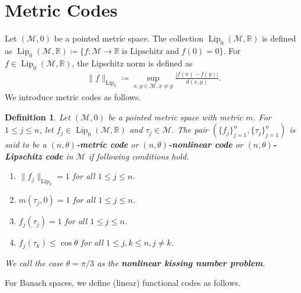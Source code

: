 \documentclass{amsart}
\newtheorem{definition}[theorem]{Definition}
\begin{document}
 \section{Metric Codes}
  Let $(\mathcal{M}, 0)$ be a pointed metric space. The collection 	$\operatorname{Lip}_0(\mathcal{M}, \mathbb{R})$
 is defined as $\operatorname{Lip}_0(\mathcal{M},\mathbb{R})\coloneqq \{f:\mathcal{M} 
 \rightarrow \mathbb{R}  \operatorname{ is ~ Lipschitz ~ and } f(0)=0\}.$
 For $f \in \operatorname{Lip}_0(\mathcal{M}, \mathbb{R})$, the Lipschitz norm
 is defined as 
 \begin{align*}
 	\|f\|_{\operatorname{Lip}_0}\coloneqq \sup_{x, y \in \mathcal{M}, x\neq
 		y} \frac{|f(x)-f(y)|}{d(x,y)}.
 \end{align*}
 We introduce metric  codes as follows.
 \begin{definition}\label{MC}
Let $(\mathcal{M}, 0)$ be a pointed metric space with metric $m$. 	 For $1\leq j \leq n$, let $f_j\in \operatorname{Lip}_0(\mathcal{M}, \mathbb{R})$ and $\tau_j \in \mathcal{M}$. The pair $ (\{f_j \}_{j=1}^n, \{\tau_j \}_{j=1}^n) $ is said to be a  \textbf{$(n,\theta)$-metric code} or \textbf{$(n,\theta)$-nonlinear code} or   \textbf{$(n,\theta)$-Lipschitz  code} in $ \mathcal{M}$
if following conditions hold.
	\begin{enumerate}[\upshape(i)]
	\item $\|f_j\|_{\operatorname{Lip}_0}=1$ for all $1\leq j \leq n$.
		\item $m(\tau_j,0)= 1$ for all $1\leq j \leq n$.
	\item 	$f_j(\tau_j)= 1$ for all $1\leq j \leq n$.
	\item $f_j(\tau_k)\leq \cos \theta $ for all $1\leq j,k \leq n, j \neq k$.
	\end{enumerate}
We call the case $\theta=\pi/3$  as the \textbf{nonlinear kissing number problem}.
 \end{definition}
For Banach spaces, we define (linear) functional codes as follows.
\end{document}
